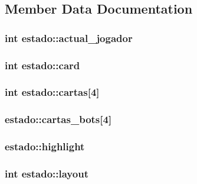 \subsection{Member Data Documentation}
\hypertarget{structestado_ad42dcb5270a9c61c0c34340995a5db52}{
\subsubsection[{actual\-\_\-jogador}]{\setlength{\rightskip}{0pt plus 5cm}int estado\-::actual\-\_\-jogador}}\label{structestado_ad42dcb5270a9c61c0c34340995a5db52}
\hypertarget{structestado_a094ab44a32a5834cdbd0fdb11de09773}{
\subsubsection[{card}]{\setlength{\rightskip}{0pt plus 5cm}int estado\-::card}}\label{structestado_a094ab44a32a5834cdbd0fdb11de09773}
\hypertarget{structestado_a1108e4a26e3cd7ed12209927c5afaa2d}{
\subsubsection[{cartas}]{\setlength{\rightskip}{0pt plus 5cm}int estado\-::cartas\mbox{[}4\mbox{]}}}\label{structestado_a1108e4a26e3cd7ed12209927c5afaa2d}
\hypertarget{structestado_a761537e3607a9604c219fdf2962dc923}{
\subsubsection[{cartas\-\_\-bots}]{ estado\-::cartas\-\_\-bots\mbox{[}4\mbox{]}}}\label{structestado_a761537e3607a9604c219fdf2962dc923}
\hypertarget{structestado_a4ce43292ae41de8f331b21724675d23f}{
\subsubsection[{highlight}]{ estado\-::highlight}}\label{structestado_a4ce43292ae41de8f331b21724675d23f}
\hypertarget{structestado_a7afaa27a28ae75993af48cc956e61b87}{
\subsubsection[{layout}]{\setlength{\rightskip}{0pt plus 5cm}int estado\-::layout}}\label{structestado_a7afaa27a28ae75993af48cc956e61b87}
